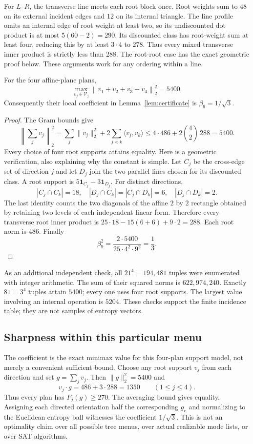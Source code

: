For $L$--$R$, the transverse line meets each root block once. Root weights
sum to $48$ on its external incident edges and $12$ on its internal
triangle. The line profile omits an internal edge of root weight at least
two, so its undiscounted dot product is at most $5(60-2)=290$.
Its discounted class has root-weight sum at least four, reducing this
by at least $3\cdot4$ to $278$. Thus every mixed transverse inner
product is strictly less than $288$. The root-root case has the exact
geometric proof below. These arguments work for any ordering within a line.

\begin{theorem}\label{thm:affine}
For the four affine-plane plans,
\[
 \max_{v_j\in\mathcal V_j}\left\|v_1+v_2+v_3+v_4\right\|_2^2=5400.
\]
Consequently their local coefficient in Lemma~\ref{lem:certificate} is
$\beta_9=1/\sqrt3$.
\end{theorem}
\begin{proof}
The Gram bounds give
\[
 \left\|\sum_jv_j\right\|_2^2
 =\sum_j\|v_j\|_2^2+2\sum_{j<k}\langle v_j,v_k\rangle
 \le4\cdot486+2\binom42\,288=5400.
\]
Every choice of four root supports attains equality. Here is a geometric
verification, also explaining why the constant is simple.
Let $C_j$ be the cross-edge set of direction $j$ and let $D_j$ join the
two parallel lines chosen for its discounted class. A root support is
$5\mathbf1_{C_j}-3\mathbf1_{D_j}$. For distinct directions,
\[
 |C_j\cap C_k|=18,\quad |D_j\cap C_k|=|C_j\cap D_k|=6,
 \quad |D_j\cap D_k|=2.
\]
The last identity counts the two diagonals of the affine $2$ by $2$
rectangle obtained by retaining two levels of each independent linear
form. Therefore every transverse root inner product is
$25\cdot18-15(6+6)+9\cdot2=288$. Each root norm is $486$.
Finally
\[
 \beta_9^2=\frac{2\cdot5400}{25\cdot4^2\cdot9^2}=\frac13.
\]
\end{proof}

As an additional independent check, all $21^4=194{,}481$ tuples were
enumerated with integer arithmetic. The sum of their squared norms is
$622{,}974{,}240$. Exactly $81=3^4$ tuples attain $5400$; every one
uses four root supports. The largest value involving an internal operation
is $5204$. These checks support the finite incidence table; they are not
samples of entropy vectors.

\subsection{Sharpness within this particular menu}
The coefficient is the exact minimax value for this four-plan support
model, not merely a convenient sufficient bound. Choose any root support
$v_j$ from each direction and set $g=\sum_jv_j$. Then
$\|g\|_2^2=5400$ and
\[
 v_j\cdot g=486+3\cdot288=1350\qquad(1\le j\le4).
\]
Thus every plan has $F_j(g)\ge270$. The averaging bound gives equality.
Assigning each directed orientation half the corresponding $g_e$ and
normalizing to the Euclidean entropy ball witnesses the coefficient
$1/\sqrt3$. This is not an optimality claim over all possible tree menus,
over actual realizable mode lists, or over SAT algorithms.


